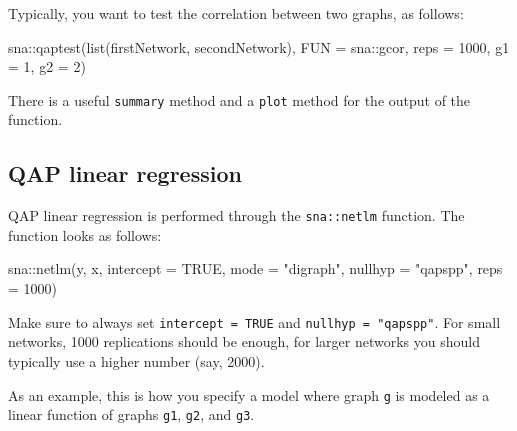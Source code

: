 \documentclass[
]{article}
\newenvironment{Shaded}{\begin{snugshade}}{\end{snugshade}}
\newcommand{\AttributeTok}[1]{\textcolor[rgb]{0.77,0.63,0.00}{#1}}
\newcommand{\ConstantTok}[1]{\textcolor[rgb]{0.00,0.00,0.00}{#1}}
\newcommand{\DecValTok}[1]{\textcolor[rgb]{0.00,0.00,0.81}{#1}}
\newcommand{\FunctionTok}[1]{\textcolor[rgb]{0.00,0.00,0.00}{#1}}
\newcommand{\NormalTok}[1]{#1}
\newcommand{\OtherTok}[1]{\textcolor[rgb]{0.56,0.35,0.01}{#1}}
\newcommand{\SpecialCharTok}[1]{\textcolor[rgb]{0.00,0.00,0.00}{#1}}
\newcommand{\StringTok}[1]{\textcolor[rgb]{0.31,0.60,0.02}{#1}}
\begin{document}
Typically, you want to test the correlation between two graphs, as
follows:

\begin{Shaded}
\begin{Highlighting}[]
\NormalTok{sna}\SpecialCharTok{::}\FunctionTok{qaptest}\NormalTok{(}\FunctionTok{list}\NormalTok{(firstNetwork, secondNetwork),}
             \AttributeTok{FUN =}\NormalTok{ sna}\SpecialCharTok{::}\NormalTok{gcor, }\AttributeTok{reps =} \DecValTok{1000}\NormalTok{,}
             \AttributeTok{g1 =} \DecValTok{1}\NormalTok{, }\AttributeTok{g2 =} \DecValTok{2}\NormalTok{)}
\end{Highlighting}
\end{Shaded}

There is a useful \texttt{summary} method and a \texttt{plot} method for
the output of the function.

\hypertarget{qap-linear-regression}{%
\subsection{QAP linear regression}\label{qap-linear-regression}}

QAP linear regression is performed through the \texttt{sna::netlm}
function. The function looks as follows:

\begin{Shaded}
\begin{Highlighting}[]
\NormalTok{sna}\SpecialCharTok{::}\FunctionTok{netlm}\NormalTok{(y, x, }\AttributeTok{intercept =} \ConstantTok{TRUE}\NormalTok{, }\AttributeTok{mode =} \StringTok{"digraph"}\NormalTok{,}
    \AttributeTok{nullhyp =} \StringTok{"qapspp"}\NormalTok{, }\AttributeTok{reps =} \DecValTok{1000}\NormalTok{)}
\end{Highlighting}
\end{Shaded}

Make sure to always set \texttt{intercept\ =\ TRUE} and
\texttt{nullhyp\ =\ "qapspp"}. For small networks, 1000 replications
should be enough, for larger networks you should typically use a higher
number (say, 2000).

As an example, this is how you specify a model where graph \texttt{g} is
modeled as a linear function of graphs \texttt{g1}, \texttt{g2}, and
\texttt{g3}.

\begin{Shaded}
\end{Shaded}
\end{document}
